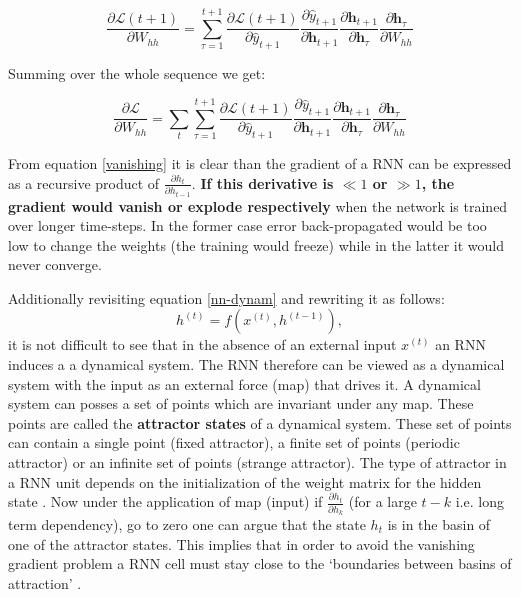 \begin{equation}
\frac{\partial \mathbf{\mathcal{L}}\left(t+1\right)}{\partial W_{hh}} = \sum_{\tau=1}^{t+1}\frac{\partial \mathbf{\mathcal{L}}\left(t+1\right)}{\partial \hat{y}_{t+1}} \frac{\partial  \hat{y}_{t+1}}{\partial \mathbf{h}_{t+1}} \frac{\partial \mathbf{h}_{t+1}}{\partial \mathbf{h}_{\tau}} \frac{\partial \mathbf{h}_{\tau}}{\partial W_{hh}}
\end{equation}

Summing over the whole sequence we get:

\begin{equation} \label{vanishing}
\frac{\partial \mathbf{\mathcal{L}}}{\partial W_{hh}} = \sum_{t}\sum_{\tau=1}^{t+1}\frac{\partial \mathbf{\mathcal{L}}\left(t+1\right)}{\partial \hat{y}_{t+1}} \frac{\partial  \hat{y}_{t+1}}{\partial \mathbf{h}_{t+1}} \frac{\partial \mathbf{h}_{t+1}}{\partial \mathbf{h}_{\tau}} \frac{\partial \mathbf{h}_{\tau}}{\partial W_{hh}}
\end{equation}

From equation \ref{vanishing} it is clear than the gradient of a RNN can be expressed as a recursive product of $\frac{\partial h_t}{\partial h_{t-1}}$. \textbf{If this derivative is $\ll 1$ or $\gg 1$, the gradient would vanish or explode respectively} when the network is trained over longer time-steps. In the former case error back-propagated would be too low to change the weights (the training would freeze) while in the latter it would never converge. 

Additionally revisiting equation \ref{nn-dynam} and rewriting it as follows:
\begin{equation}\label{ndq}	
h^{(t)} = f(x^{(t)}, h^{(t-1)}),
\end{equation}
it is not difficult to see that in the absence of an external input $x^{(t)}$ an RNN induces a a dynamical system. The RNN therefore can be viewed as a dynamical system with the input as an external force (map) that drives it. A dynamical system can posses a set of points which are invariant under any map. These points are called the \textbf{attractor states} of a dynamical system. These set of points can contain a single point (fixed attractor), a finite set of points (periodic attractor) or an infinite set of points (strange attractor). The type of attractor in a RNN unit depends on the initialization of the weight matrix for the hidden state \citep{Bengio1993}. Now under the application of map (input) if $\frac{\partial h_t}{\partial h_{k}}$ (for a large $t - k$ i.e. long term dependency), go to zero one can argue that the state $h_t$ is in the basin of one of the attractor states. This implies that in order to avoid the vanishing gradient problem a RNN cell must stay close to the \lq boundaries between basins of attraction\rq{} \citep{Pascanu2012}.

